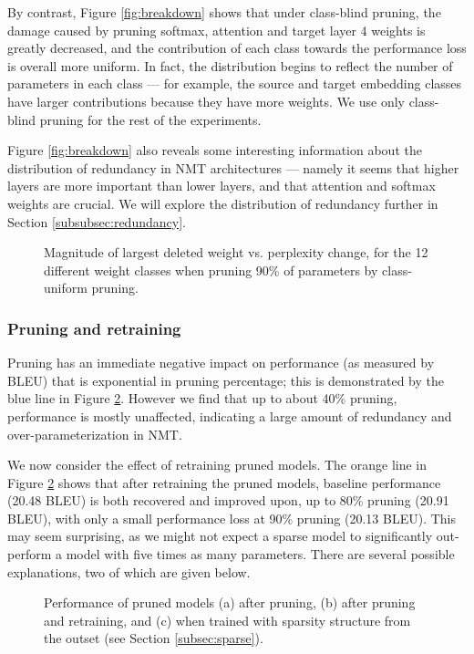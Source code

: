 By contrast, Figure \ref{fig:breakdown} shows that under class-blind pruning, the damage caused by pruning softmax, attention and target layer 4 weights is greatly decreased, and the contribution of each class towards the performance loss is overall more uniform.
In fact, the distribution begins to reflect the number of parameters in each class --- for example, the source and target embedding classes have larger contributions because they have more weights. 
We use only class-blind pruning for the rest of the experiments.

Figure \ref{fig:breakdown} also reveals some interesting information about the
distribution of redundancy in NMT architectures --- namely it seems that higher
layers are more important than lower layers, and that attention and softmax
weights are crucial. We will explore the distribution of redundancy further in
Section \ref{subsubsec:redundancy}.

\begin{figure}
\centering

\caption[Magnitude of largest deleted weight vs. perplexity change]{Magnitude of largest deleted weight vs. perplexity change, for the 12
different weight classes when pruning 90\% of parameters by class-uniform
pruning.}
\label{fig:scatter}
\end{figure}

\subsubsection{Pruning and retraining}
\label{subsec:effect}


Pruning has an immediate negative impact on performance (as measured by BLEU) that is exponential in pruning percentage; this is demonstrated by the blue line in Figure \ref{fig:main_results}.
However we find that up to about 40\% pruning, performance is mostly unaffected, indicating a large amount of redundancy and over-parameterization in NMT.

We now consider the effect of retraining pruned models.
The orange line in Figure \ref{fig:main_results} shows that after retraining the pruned models, baseline performance (20.48 BLEU) is both recovered and improved upon, up to 80\% pruning (20.91 BLEU), with only a small performance loss at 90\% pruning (20.13 BLEU).
This may seem surprising, as we might not expect a sparse model to significantly out-perform a model with five times as many parameters.
There are several possible explanations, two of which are given below.
\begin{figure}
\centering

\caption[Performance of pruned models]{Performance of pruned models (a) after pruning, (b) after pruning and
retraining, and (c) when trained with sparsity structure from the outset (see
Section \ref{subsec:sparse}).}
\label{fig:main_results}
\end{figure}

